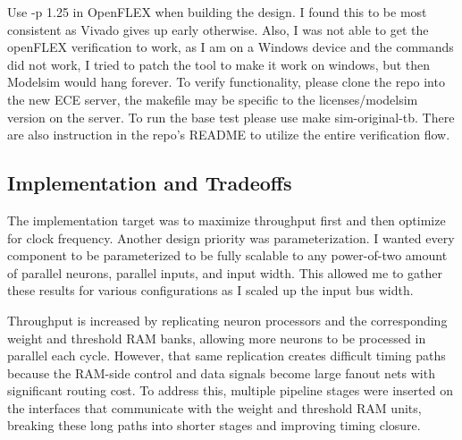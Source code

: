 \begin{strip}
  \centering
  \label{tab:design-space-resources}
\end{strip}

\medskip
{}
Use -p 1.25 in OpenFLEX when building the design. I found this to be most consistent 
as Vivado gives up early otherwise.
Also, I was not able to get the openFLEX verification to work, as I am on a Windows device and 
the commands did not work, I tried to patch the tool to make it work on windows, but
then Modelsim would hang forever. To verify functionality, please clone the repo into the new ECE server, 
the makefile may be specific to the licenses/modelsim version on the server. 
To run the base test please use make sim-original-tb.
There are also instruction in the repo's README to utilize the entire verification flow.

\subsection{Implementation and Tradeoffs}

The implementation target was to maximize throughput first and then optimize
for clock frequency. Another design priority was parameterization. I wanted 
every component to be parameterized to be fully scalable to any power-of-two amount of 
parallel neurons, parallel inputs, and input width. This allowed me to gather 
these results for various configurations as I scaled up the input bus width.

Throughput is increased by replicating neuron processors
and the corresponding weight and threshold RAM banks, allowing more neurons to
be processed in parallel each cycle. However, that same replication creates
difficult timing paths because the RAM-side control and data signals become
large fanout nets with significant routing cost. To address this, multiple
pipeline stages were inserted on the interfaces that communicate with the
weight and threshold RAM units, breaking these long paths into shorter stages
and improving timing closure.

